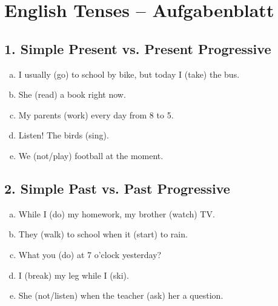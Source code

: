 
\section*{English Tenses – Aufgabenblatt}

\subsection*{1. Simple Present vs. Present Progressive}
\begin{enumerate}[a)]
    \item I usually \underline{\hspace{2cm}} (go) to school by bike, but today I \underline{\hspace{2cm}} (take) the bus.
    \item She \underline{\hspace{2cm}} (read) a book right now.
    \item My parents \underline{\hspace{2cm}} (work) every day from 8 to 5.
    \item Listen! The birds \underline{\hspace{2cm}} (sing).
    \item We \underline{\hspace{2cm}} (not/play) football at the moment.
\end{enumerate}

\subsection*{2. Simple Past vs. Past Progressive}
\begin{enumerate}[a)]
    \item While I \underline{\hspace{2cm}} (do) my homework, my brother \underline{\hspace{2cm}} (watch) TV.
    \item They \underline{\hspace{2cm}} (walk) to school when it \underline{\hspace{2cm}} (start) to rain.
    \item What \underline{\hspace{2cm}} you \underline{\hspace{2cm}} (do) at 7 o'clock yesterday?
    \item I \underline{\hspace{2cm}} (break) my leg while I \underline{\hspace{2cm}} (ski).
    \item She \underline{\hspace{2cm}} (not/listen) when the teacher \underline{\hspace{2cm}} (ask) her a question.
\end{enumerate}

